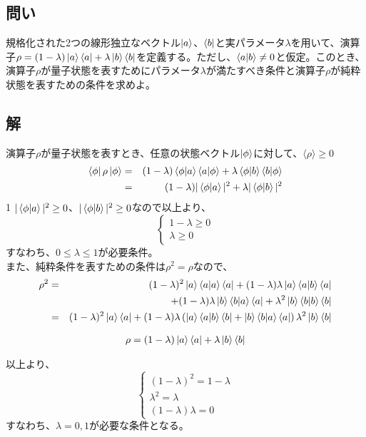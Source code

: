 \documentclass[10pt]{ujarticle}
\begin{document}
\subsection{問い}
規格化された2つの線形独立なベクトル$\ket{a}$、$\bra{b}$と実パラメータ$\lambda$を用いて、演算子$\rho=(1-\lambda)\ket{a}\bra{a}+\lambda\ket{b}\bra{b}$を定義する。ただし、$\braket{a|b}\neq0$と仮定。このとき、演算子$\rho$が量子状態を表すためにパラメータ$\lambda$が満たすべき条件と演算子$\rho$が純粋状態を表すための条件を求めよ。

\subsection{解}
演算子$\rho$が量子状態を表すとき、任意の状態ベクトル$\ket{\phi}$に対して、$\langle \rho \rangle \geq 0$
\begin{eqnarray*}
  \bra{\phi} \rho \ket{\phi} &=& (1-\lambda) \braket{\phi|a}\braket{a|\phi}+\lambda\braket{\phi|b}\braket{b|\phi}\\
  &=& (1-\lambda)|\braket{\phi|a}|^2 + \lambda|\braket{\phi|b}|^2
\end{eqnarray*}1
$|\braket{\phi|a}|^2\geq0$、$|\braket{\phi|b}|^2\geq0$なので以上より、
\[
\begin{cases}
  1-\lambda \geq 0\\
  \lambda \geq 0
\end{cases}
\]
すなわち、$0\leq\lambda\leq1$が必要条件。\\
また、純粋条件を表すための条件は$\rho^2=\rho$なので、
\begin{eqnarray*}
  \rho^2 &=& (1-\lambda)^2 \ket{a}\braket{a|a}\bra{a}+(1-\lambda)\lambda\ket{a}\braket{a|b}\bra{a}\\
  &&+(1-\lambda)\lambda\ket{b}\braket{b|a}\bra{a}+\lambda^2 \ket{b}\braket{b|b}\bra{b}\\
  &=&(1-\lambda)^2\ket{a}\bra{a}+(1-\lambda)\lambda\left(\ket{a}\braket{a|b}\bra{b}+\ket{b}\braket{b|a}\bra{a}\right)\lambda^2\ket{b}\bra{b}
\end{eqnarray*}

\begin{eqnarray*}
  \rho = (1-\lambda)\ket{a}\bra{a}+\lambda\ket{b}\bra{b}
\end{eqnarray*}

以上より、
\[
\begin{cases}
  (1-\lambda)^2 = 1- \lambda\\
  \lambda^2 = \lambda\\
  (1-\lambda)\lambda = 0
\end{cases}
\]
すなわち、$\lambda = 0, 1$が必要な条件となる。
\end{document}
